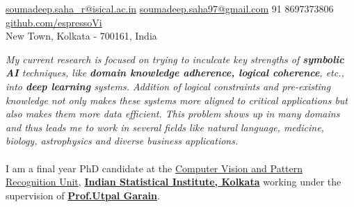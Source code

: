 \documentclass[10pt,a4paper]{article}
\begin{document}
\sloppy


\nobreakvspace{0.3em}

\noindent\href{mailto:soumadeep.saha\_r@isical.ac.in}{soumadeep.saha\_r@isical.ac.in}\sbull
\noindent\href{mailto:soumadeep.saha97@gmail.com}{soumadeep.saha97@gmail.com}\sbull
\textsmaller{+}91 8697373806\sbull
\href{https://github.com/espressoVi}{github.com/espressoVi}\\
New Town, Kolkata - 700161, India

\spacedhrule{0.9em}{-0.4em}


\vspace{-1.3em}  %
\begin{multicols}{2}  %
\noindent \emph{My current research is focused on trying to inculcate key 
    strengths of \textbf{symbolic AI} techniques, like
    \textbf{domain knowledge adherence, logical coherence}, etc., into
    \textbf{deep learning} systems. Addition of logical constraints and
    pre-existing knowledge not only makes these systems more aligned to critical
    applications but also makes them more data efficient. This problem shows up
    in many domains and thus leads me to work in several fields like natural
    language, medicine, biology, astrophysics and diverse business applications.
    }
\\
\\
	I am a final year PhD candidate at the 
    \href{https://cvpru.isical.ac.in/}{Computer Vision and Pattern Recognition 
    Unit}, \href{https://www.isical.ac.in/}{\textbf{Indian Statistical Institute, Kolkata}}
    working under the supervision of 
    \textbf{\href{https://www.isical.ac.in/~utpal}{Prof.\;Utpal Garain}}.
\end{multicols}
\end{document}
